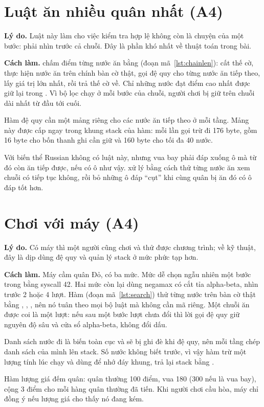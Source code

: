 
\section{Luật ăn nhiều quân nhất (A4)}

\textbf{Lý do.} Luật này làm cho việc kiểm tra hợp lệ không còn là chuyện của một bước: phải nhìn trước cả chuỗi. Đây là phần khó nhất về thuật toán trong bài.

\textbf{Cách làm.}  chấm điểm từng nước ăn bằng  (đoạn mã~\ref{lst:chainlen}): cất thế cờ, thực hiện nước ăn trên chính bàn cờ thật, gọi đệ quy cho từng nước ăn tiếp theo, lấy giá trị lớn nhất, rồi trả thế cờ về. Chỉ những nước đạt điểm cao nhất được giữ lại trong . Vì bộ lọc chạy ở mỗi bước của chuỗi, người chơi bị giữ trên chuỗi dài nhất từ đầu tới cuối.

Hàm đệ quy cần một mảng riêng cho các nước ăn tiếp theo ở mỗi tầng. Mảng này được cấp ngay trong khung stack của hàm: mỗi lần gọi trừ  đi 176 byte, gồm 16 byte cho bốn thanh ghi cần giữ và 160 byte cho tối đa 40 nước.


Với biến thể Russian không có luật này, nhưng vua bay phải đáp xuống ô mà từ đó còn ăn tiếp được, nếu có ô như vậy.  xử lý bằng cách thử từng nước ăn xem chuỗi có tiếp tục không, rồi bỏ những ô đáp ``cụt'' khi cùng quân bị ăn đó có ô đáp tốt hơn.

\section{Chơi với máy (A4)}

\textbf{Lý do.} Có máy thì một người cũng chơi và thử được chương trình; về kỹ thuật, đây là dịp dùng đệ quy và quản lý stack ở mức phức tạp hơn.

\textbf{Cách làm.} Máy cầm quân Đỏ, có ba mức. Mức dễ chọn ngẫu nhiên một bước trong  bằng syscall 42. Hai mức còn lại dùng negamax có cắt tỉa alpha-beta, nhìn trước 2 hoặc 4 lượt. Hàm  (đoạn mã~\ref{lst:search}) thử từng nước trên bàn cờ thật bằng , , , nên nó tuân theo mọi bộ luật mà không cần mã riêng. Một chuỗi ăn được coi là một lượt: nếu sau một bước lượt chưa đổi thì lời gọi đệ quy giữ nguyên độ sâu và cửa sổ alpha-beta, không đổi dấu.

Danh sách nước đi là biến toàn cục và sẽ bị ghi đè khi đệ quy, nên mỗi tầng chép danh sách của mình lên stack. Số nước không biết trước, vì vậy hàm trừ  một lượng tính lúc chạy và dùng  để nhớ đáy khung, trả lại stack bằng .


Hàm lượng giá đếm quân: quân thường 100 điểm, vua 180 (300 nếu là vua bay), cộng 3 điểm cho mỗi hàng quân thường đã tiến. Khi người chơi cầu hòa, máy chỉ đồng ý nếu lượng giá cho thấy nó đang kém.

